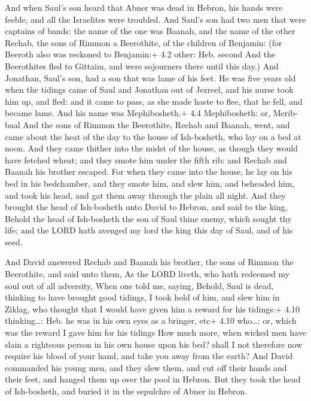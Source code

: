  And when Saul's son heard that Abner was dead in Hebron,
his hands were feeble, and all the Israelites were troubled.
 And Saul's son had two men that were captains of bands: the
name of the one was Baanah, and the name of the other Rechab, the sons
of Rimmon a Beerothite, of the children of Benjamin: (for Beeroth also
was reckoned to Benjamin:+ 4.2 other: Heb. second  And the
Beerothites fled to Gittaim, and were sojourners there until this day.)
 And Jonathan, Saul's son, had a son that was lame of his
feet. He was five years old when the tidings came of Saul and Jonathan
out of Jezreel, and his nurse took him up, and fled: and it came to
pass, as she made haste to flee, that he fell, and became lame. And his
name was Mephibosheth.+ 4.4 Mephibosheth: or, Merib-baal 
And the sons of Rimmon the Beerothite, Rechab and Baanah, went, and came
about the heat of the day to the house of Ish-bosheth, who lay on a bed
at noon.  And they came thither into the midst of the house,
as though they would have fetched wheat; and they smote him under the
fifth rib: and Rechab and Baanah his brother escaped.  For
when they came into the house, he lay on his bed in his bedchamber, and
they smote him, and slew him, and beheaded him, and took his head, and
gat them away through the plain all night.  And they brought
the head of Ish-bosheth unto David to Hebron, and said to the king,
Behold the head of Ish-bosheth the son of Saul thine enemy, which sought
thy life; and the LORD hath avenged my lord the king this day of Saul,
and of his seed.

 And David answered Rechab and Baanah his brother, the
sons of Rimmon the Beerothite, and said unto them, As the LORD liveth,
who hath redeemed my soul out of all adversity,  When one
told me, saying, Behold, Saul is dead, thinking to have brought good
tidings, I took hold of him, and slew him in Ziklag, who thought that I
would have given him a reward for his tidings:+ 4.10 thinking\ldots:
Heb. he was in his own eyes as a bringer, etc+ 4.10 who\ldots: or, which
was the reward I gave him for his tidings  How much more,
when wicked men have slain a righteous person in his own house upon his
bed? shall I not therefore now require his blood of your hand, and take
you away from the earth?  And David commanded his young
men, and they slew them, and cut off their hands and their feet, and
hanged them up over the pool in Hebron. But they took the head of
Ish-bosheth, and buried it in the sepulchre of Abner in Hebron.

